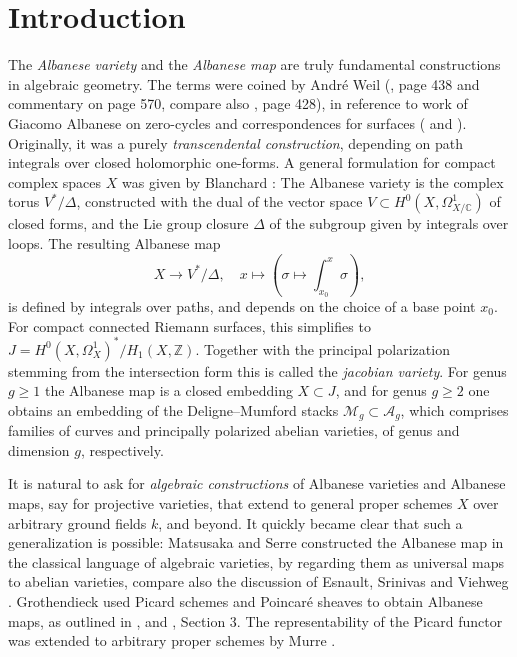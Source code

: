 \documentclass[oneside, 12pt]{amsart}
\newcommand\mylabel[1]{\label{#1}\marginpar{\raggedright\vspace{-1ex}\medskip\medskip\footnotesize \tt #1}}
\renewcommand\mylabel[1]{\label{#1}}
\theoremstyle{definition}
\theoremstyle{remark}
\newcommand{\ZZ}{\mathbb{Z}}
\newcommand{\CC}{\mathbb{C}}
\newcommand{\shA}{\mathscr{A}}
\newcommand{\shM}{\mathscr{M}}
\newcommand{\lra}{\longrightarrow}
\begin{document}
\newcommand{\rara}{\rightrightarrows}
\newcommand{\Rng}{\text{Rgn}}
\newcommand{\Opn}{\text{Opn}}
\newcommand{\catSO}{\operatorname{\mathcal{SO}}}
\newcommand{\Cls}{\text{Cls}}
\newcommand{\AffOpn}{{\rm\text{AffOpn}}}
\newcommand{\AlgSpc}{{\rm\text{\rm AlgSpc}}}
\newcommand{\catSF}{ \operatorname{\mathcal{SF}}}
\newcommand{\ab}{\text{\rm ab}}
\newcommand{\uExt}{\underline{\operatorname{Ext}}}

\section*{Introduction}
\mylabel{introduction}

The \emph{Albanese variety} and the \emph{Albanese map} are truly fundamental constructions in algebraic geometry.
The terms were   coined by Andr\'e Weil (\cite{Weil 1979}, page 438 and commentary on page 570, compare also \cite{Kleiman 2004}, page 428), in reference to 
work of Giacomo Albanese on zero-cycles and correspondences for  surfaces (\cite{Albanese 1934a} and \cite{Albanese 1934b}).
Originally, it was a purely \emph{transcendental construction}, depending on  path integrals over closed holomorphic one-forms.
A general formulation for compact complex spaces $X$ was given by Blanchard \cite{Blanchard 1956}:
The Albanese variety is the complex torus $V^*/\Delta$,  
constructed with the   dual   of the   vector space   $V\subset H^0(X,\Omega^1_{X/\CC})$ of closed forms, and
the Lie group closure $\Delta$   of the subgroup given by   integrals over loops. The resulting Albanese map 
$$
X\lra V^*/\Delta,\quad  x\longmapsto (\sigma\mapsto \int_{x_0}^x\sigma),
$$
is   defined by integrals over paths, and depends on the choice of a base point $x_0$.
For compact connected Riemann surfaces, this simplifies to $J=H^0(X,\Omega^1_X)^*/H_1(X,\ZZ)$.
Together with the principal polarization stemming from the intersection form this is called the \emph{jacobian variety}.
For genus $g\geq 1$ the Albanese map is  a closed embedding $X\subset J$, and for genus $g\geq 2$ one obtains an embedding
of the    Deligne--Mumford stacks $\shM_g\subset\shA_g$, which comprises   families of curves  and   principally polarized
abelian varieties, of   genus and dimension $g$, respectively.

It is natural to ask for  \emph{algebraic constructions} of   Albanese varieties and   Albanese maps, 
say for projective varieties, that extend  to general proper schemes $X$ over arbitrary ground fields $k$, and beyond. 
It quickly became clear that such a generalization is possible:
Matsusaka \cite{Matsusaka 1953} and Serre \cite{Serre 1960}   constructed the Albanese map  in   the classical language of algebraic varieties, by regarding
them as universal maps to abelian varieties, compare also the discussion of Esnault, Srinivas and Viehweg \cite{Esnault; Srinivas; Viehweg 1992}.
Grothendieck used  Picard schemes and Poincar\'e sheaves to obtain   Albanese maps, as outlined
in  \cite{FGA V}, and \cite{FGA VI}, Section 3.
The representability of the Picard functor was extended to arbitrary proper schemes by Murre \cite{Murre 1964}.
 
\end{document}
